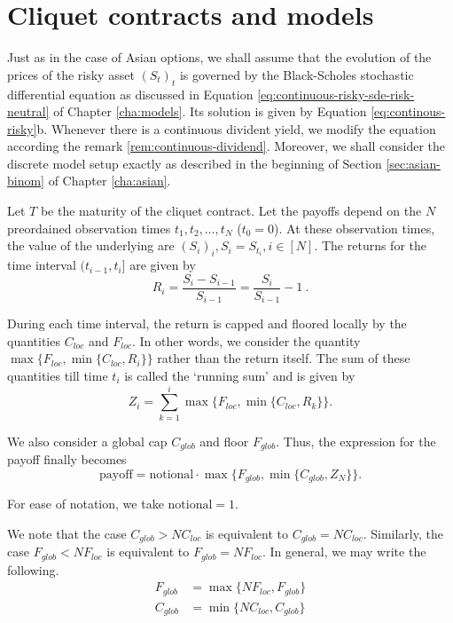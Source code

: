 \section{Cliquet contracts and models}
\label{sec:clq-models}

Just as in the case of Asian options, we shall assume that the evolution of the prices of the risky asset $ (S_t)_t $ is governed by the Black-Scholes stochastic differential equation as discussed in Equation \ref{eq:continuous-risky-sde-risk-neutral} of Chapter \ref{cha:models}. Its solution is given by Equation \ref{eq:continous-risky}b. Whenever there is a continuous divident yield, we modify the equation according the remark \ref{rem:continuous-dividend}. Moreover, we shall consider the discrete model setup exactly as described in the beginning of Section \ref{sec:asian-binom} of Chapter \ref{cha:asian}.


Let $T$ be the maturity of the cliquet contract. Let the payoffs depend on the $ N $ preordained observation times $ t_1, t_2, \dots, t_{N} $ ($ t_0 = 0 $). At these observation times, the value of the underlying are $ ( S_i )_i, S_i = S_{t_i}, i \in \left[ N \right] $. The returns for the time interval $ ( t_{i-1}, t_i ] $ are given by
\begin{equation}
	\label{eq:clq-return}
	R_i = \frac{S_i - S_{i-1}}{S_{i-1}} = \frac{S_i}{S_{i-1}} - 1 \ .
\end{equation}

During each time interval, the return is capped and floored locally by the quantities $ C_{loc} $ and $ F_{loc} $. In other words, we consider the quantity $ \max \{ F_{loc}, \min \{ C_{loc}, R_i \} \} $ rather than the return itself. The sum of these quantities till time $t_i$ is called the `running sum' and is given by
\begin{equation}
	\label{eq:clq-rsz}
	Z_i = \sum_{k = 1}^{i} \max \{ F_{loc}, \min \{ C_{loc}, R_k \} \}.
\end{equation}

We also consider a global cap $ C_{glob} $ and floor $ F_{glob} $. Thus, the expression for the payoff finally becomes
\begin{equation}
	\label{eq:clq-payoff}
	\mathrm{payoff} = \mathrm{notional} \cdot \max \{ F_{glob}, \min \{ C_{glob}, Z_{N} \} \}.
\end{equation}

For ease of notation, we take $ \mathrm{notional} = 1 $.

We note that the case $ C_{glob} > N C_{loc} $ is equivalent to $ C_{glob} = N C_{loc} $. Similarly, the case $ F_{glob} < N F_{loc} $ is equivalent to $ F_{glob} = N F_{loc} $. In general, we may write the following.
\begin{subequations}
	\label{eq:clq-update-glob}
	\begin{align*}
		F_{glob} &= \max \{ N F_{loc}, F_{glob} \}  \\
		C_{glob} &= \min \{ N C_{loc}, C_{glob} \}
	\end{align*}
\end{subequations}

